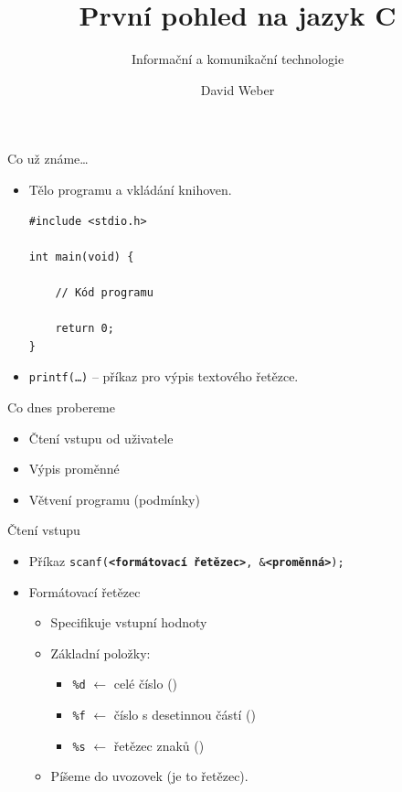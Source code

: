 \documentclass[14pt]{beamer}
\subtitle{Informační a komunikační technologie}
\title{První pohled na jazyk C}
\author{David Weber}
\begin{document}

    \begin{frame}
        \titlepage
    \end{frame}

    \begin{frame}[t,fragile]{Co už známe\dots}
        \begin{itemize}
            \item Tělo programu a vkládání knihoven.
            \begin{lstlisting}
#include <stdio.h>

int main(void) {

    // Kód programu

    return 0;
}
            \end{lstlisting}
            \item \texttt{printf(\dots)} -- příkaz pro výpis textového řetězce.
        \end{itemize}
    \end{frame}

    \begin{frame}[t]{Co dnes probereme}
        \begin{itemize}
            \item Čtení vstupu od uživatele
            \item Výpis proměnné
            \item Větvení programu (podmínky)
        \end{itemize}
    \end{frame}

    \begin{frame}[t]{Čtení vstupu}
        \begin{itemize}
            \item Příkaz \texttt{scanf(\textbf{<formátovací řetězec>}, \&\textbf{<proměnná>});}
            \item Formátovací řetězec
            \begin{itemize}
                \item Specifikuje  vstupní hodnoty
                \item Základní položky:
                \begin{itemize}
                    \item \texttt{\%d} $\leftarrow$ celé číslo ()
                    \item \texttt{\%f} $\leftarrow$ číslo s desetinnou částí ()
                    \item \texttt{\%s} $\leftarrow$ řetězec znaků ()
                \end{itemize}
                \item Píšeme do uvozovek \textquotedbl{} \textquotedbl (je to řetězec).
            \end{itemize}
        \end{itemize}
    \end{frame}
\end{document}
